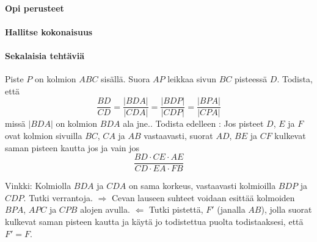 \begin{tehtavasivu}
\paragraph*{Opi perusteet}

\paragraph*{Hallitse kokonaisuus}

\paragraph*{Sekalaisia tehtäviä}

\begin{tehtava}
Piste $P$ on kolmion $ABC$ sisällä. Suora $AP$ leikkaa sivun $BC$ pisteessä $D$. Todista, että
\[
\frac{BD}{CD} = \frac{|BDA|}{|CDA|} = \frac{|BDP|}{|CDP|} = \frac{|BPA|}{|CPA|}
\]
missä $|BDA|$ on kolmion $BDA$ ala jne.. Todista edelleen : Jos pisteet $D$, $E$ ja $F$ ovat kolmion sivuilla $BC$, $CA$ ja $AB$ vastaavasti, suorat $AD$, $BE$ ja $CF$ kulkevat saman pisteen kautta jos ja vain jos
\[
\frac{BD\cdot CE \cdot AE}{CD \cdot EA \cdot FB}
\]
\begin{vastaus}
Vinkki: Kolmiolla $BDA$ ja $CDA$ on sama korkeus, vastaavasti kolmioilla $BDP$ ja $CDP$. Tutki verrantoja. $\Rightarrow$ Cevan lauseen suhteet voidaan esittää kolmoiden $BPA$, $APC$ ja $CPB$ alojen avulla. $\Leftarrow$ Tutki pistettä, $F'$ (janalla $AB$), jolla suorat kulkevat saman pisteen kautta ja käytä jo todistettua puolta todistaaksesi, että $F' = F$.
\end{vastaus}
\end{tehtava}
\end{tehtavasivu}

